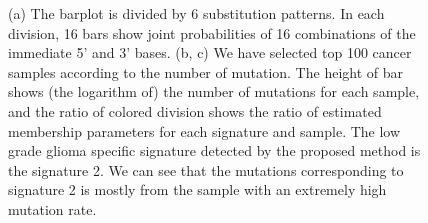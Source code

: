 \documentclass{article}
\begin{document}
\begin{figure}
\centering

  
\quad
{}

  \caption{(a) The barplot is divided by 6 substitution patterns. In each division, 
16 bars show joint probabilities of 16 combinations of the immediate 5' and 3' bases.
(b, c) We have selected top 100 cancer samples according to the number of mutation.
The height of bar shows (the logarithm of) the number of mutations for each sample,
and the ratio of colored division shows the ratio of estimated membership parameters for each signature and sample.
The low grade glioma specific signature detected by the proposed method is the signature 2.
We can see that the mutations corresponding to signature 2 is mostly from the sample with an extremely high mutation rate.
}

\end{figure}
\end{document}
